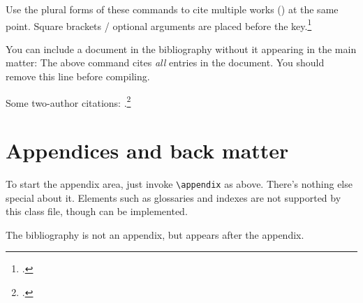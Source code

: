 \documentclass{grattan}
\begin{document}
Use the plural forms of these commands to cite multiple works (\textcites{Piketty2013}{Leigh-2013-BattlersBillionaires}) at the same point.
Square brackets / optional arguments are placed before the key.\footcites{AtkinsonStiglitz1976}[][42]{MirrleesAdamBesleyEtAl2011}


You can include a document in the bibliography without it appearing in the main matter: %
The above command cites \emph{all} entries in the document. 
You should remove this line before compiling. 

Some two-author citations: \textcite{Norton2014Doubtfuldebtrising}.\footcites{DuckettBreadon-2014-Unlocking-skills}{Duckett-2016-Premium-policy-getting-more-from-PBS}{Norton2015Universityfeeswhat}{Norton2015cashnexushow}

\appendix

\chapter{Appendices and back matter}\label{chap:appendices}
To start the appendix area, just invoke \verb=\appendix= as above. 
There's nothing else special about it.
Elements such as glossaries and indexes are not supported by this class file, though can be implemented.

The bibliography is not an appendix, but appears after the appendix. 


\printbibliography
\end{document}
